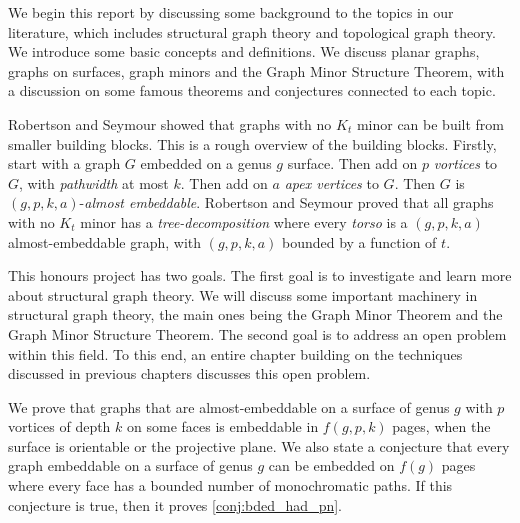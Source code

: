 We begin this report by discussing some background to the topics in our literature, which includes structural graph theory and topological graph theory. We introduce some basic concepts and definitions. We discuss planar graphs, graphs on surfaces, graph minors and the Graph Minor Structure Theorem, with a discussion on some famous theorems and conjectures connected to each topic. 

Robertson and Seymour showed that graphs with no \(K_t\) minor can be built from smaller building blocks. This is a rough overview of the building blocks. Firstly, start with a graph \(G\) embedded on a genus \(g\) surface. Then add on \(p\) \textit{vortices} to \(G\), with \textit{pathwidth} at most \(k\). Then add on \(a\) \textit{apex vertices} to \(G\). Then \(G\) is \((g, p, k, a)\)-\textit{almost embeddable}. Robertson and Seymour \cite{robertsonGraphMinorsXVI2003} proved that all graphs with no \(K_t\) minor has a \textit{tree-decomposition} where every \textit{torso} is a \((g, p, k, a)\) almost-embeddable graph, with \((g, p, k, a)\) bounded by a function of \(t\).

This honours project has two goals. The first goal is to investigate and learn more about structural graph theory. We will discuss some important machinery in structural graph theory, the main ones being the Graph Minor Theorem and the Graph Minor Structure Theorem. The second goal is to address an open problem within this field. To this end, an entire chapter building on the techniques discussed in previous chapters discusses this open problem. 

We prove that graphs that are almost-embeddable on a surface of genus $g$ with $p$ vortices of depth $k$ on some faces is embeddable in $f(g, p, k)$ pages, when the surface is orientable or the projective plane. We also state a conjecture that every graph embeddable on a surface of genus $g$ can be embedded on $f(g)$ pages where every face has a bounded number of monochromatic paths. If this conjecture is true, then it proves \cref{conj:bded_had_pn}. 